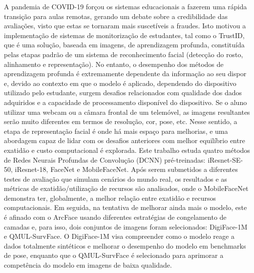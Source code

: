 \documentclass[class=report, crop=false, a4paper, 12pt]{standalone}
\begin{document}
\par A pandemia de COVID-19 forçou os sistemas educacionais a fazerem uma rápida transição para aulas remotas, gerando um debate sobre a credibilidade das avaliações, visto que estas se tornaram mais suscetíveis a fraudes. Isto motivou a implementação de sistemas de monitorização de estudantes, tal como o TrustID, que é uma solução, baseada em imagens, de aprendizagem profunda, constituída pelas etapas padrão de um sistema de reconhecimento facial (detecção do rosto, alinhamento e representação). No entanto, o desempenho dos métodos de aprendizagem profunda é extremamente dependente da informação ao seu dispor e, devido ao contexto em que o modelo é aplicado, dependendo do dispositivo utilizado pelo estudante, surgem desafios relacionados com qualidade dos dados adquiridos e a capacidade de processamento disponível do dispositivo. Se o aluno utilizar uma webcam ou a câmara frontal de um telemóvel, as imagens resultantes serão muito diferentes em termos de resolução, cor, pose, etc. Nesse sentido, a etapa de representação facial é onde há mais espaço para melhorias, e uma abordagem capaz de lidar com os desafios anteriores com melhor equilíbrio entre exatidão e custo computacional é explorada. Este trabalho estuda quatro métodos de Redes Neurais Profundas de Convolução (DCNN) pré-treinadas: iResnet-SE-50, iResnet-18, FaceNet e MobileFaceNet. Após serem submetidos a diferentes testes de avaliação que simulam cenários do mundo real, os resultados e as métricas de exatidão/utilização de recursos são analisados, onde o MobileFaceNet demonstra ter, globalmente, a melhor relação entre exatidão e recursos computacionais. Em seguida, na tentativa de melhorar ainda mais o modelo, este é afinado com o ArcFace usando diferentes estratégias de congelamento de camadas e, para isso, dois conjuntos de imagens foram selecionados: DigiFace-1M e QMUL-SurvFace. O DigiFace-1M visa compreender como o modelo reage a dados totalmente sintéticos e melhorar o desempenho do modelo em benchmarks de pose, enquanto que o QMUL-SurvFace é selecionado para aprimorar a competência do modelo em imagens de baixa qualidade.
\end{document}
